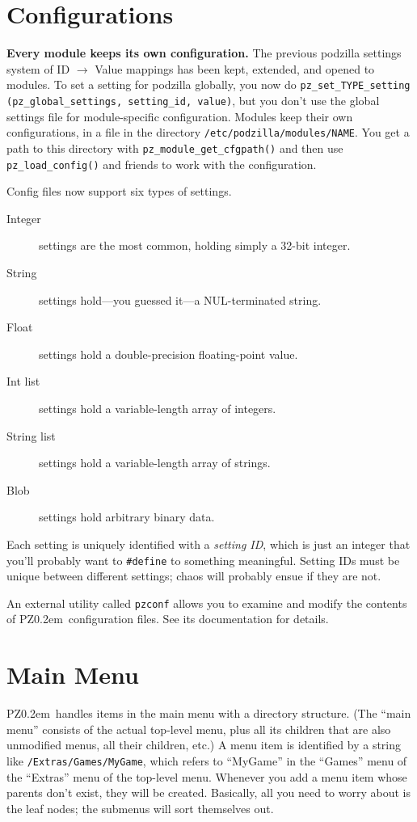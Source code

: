 \documentclass[12pt,letterpaper]{report}
\def\pz{{\footnotesize PZ}}
\def\pzt{\pz\kern0.2em{\large\oldstyle2}}
\begin{document}
\section{Configurations}
{\bf Every module keeps its own configuration.} The previous podzilla settings system of
ID $\to$ Value mappings has been kept, extended, and opened to modules. To set a setting
for podzilla globally, you now do \verb|pz_set_TYPE_setting (pz_global_settings, setting_id, value)|,
but you don't use the global settings file for module-specific configuration. Modules keep
their own configurations, in a file in the directory \verb|/etc/podzilla/|\hskip0pt\verb|modules/NAME|. You
get a path to this directory with \verb|pz_module_get_cfgpath()| and then use \verb|pz_load_config()|
and friends to work with the configuration.

Config files now support six types of settings.
\begin{description}
\item[Integer] settings are the most common, holding simply a 32-bit integer.
\item[String] settings hold---you guessed it---a NUL-terminated string.
\item[Float] settings hold a double-precision floating-point value.
\item[Int list] settings hold a variable-length array of integers.
\item[String list] settings hold a variable-length array of strings.
\item[Blob] settings hold arbitrary binary data.
\end{description}
Each setting is uniquely identified with a {\sl setting ID}, which is just an integer that
you'll probably want to \verb|#define| to something meaningful. Setting IDs must be unique
between different settings; chaos will probably ensue if they are not.

An external utility called \verb|pzconf| allows you to examine and modify the contents of
\pzt\ configuration files. See its documentation for details.

\section{Main Menu}
\pzt\ handles items in the main menu with a directory structure. (The ``main menu'' consists
of the actual top-level menu, plus all its children that are also unmodified menus, all their
children, etc.) A menu item is identified by a string like \verb|/Extras/Games/MyGame|, which
refers to ``MyGame'' in the ``Games'' menu of the ``Extras'' menu of the top-level menu.
Whenever you add a menu item whose parents don't exist, they will be created. Basically, all
you need to worry about is the leaf nodes; the submenus will sort themselves out.
\end{document}
